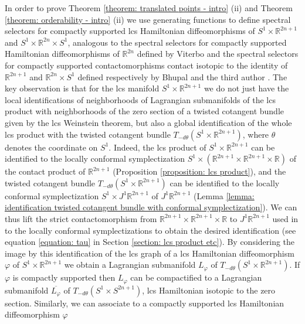 \documentclass{amsart}
\theoremstyle{remark}
\begin{document}
In order to prove Theorem \ref{theorem: translated points - intro} (ii)
and Theorem \ref{theorem: orderability - intro} (ii)
we use generating functions to define spectral selectors
for compactly supported lcs Hamiltonian diffeomorphisms
of $S^1 \times \mathbb{R}^{2n+1}$ and $S^1 \times \mathbb{R}^{2n} \times S^1$,
analogous to the spectral selectors for compactly supported
Hamiltonian diffeomorphisms of $\mathbb{R}^{2n}$
defined by Viterbo \cite{Viterbo}
and the spectral selectors for compactly supported contactomorphisms
contact isotopic to the identity of $\mathbb{R}^{2n+1}$ and $\mathbb{R}^{2n} \times S^1$
defined respectively by Bhupal \cite{Bhupal} and the third author \cite{San10, San11}.
The key observation is that
for the lcs manifold $S^1 \times \mathbb{R}^{2n+1}$
we do not just have the local identifications
of neighborhoods of Lagrangian submanifolds of the lcs product
with neighborhoods of the zero section of a twisted cotangent bundle
given by the lcs Weinstein theorem,
but also a global identification of the whole lcs product
with the twisted cotangent bundle $T_{-d\theta} (S^1 \times \mathbb{R}^{2n+1})$,
where $\theta$ denotes the coordinate on $S^1$.
Indeed,
the lcs product of $S^1 \times \mathbb{R}^{2n+1}$
can be identified to the locally conformal symplectization
$S^1 \times (\mathbb{R}^{2n+1} \times \mathbb{R}^{2n+1} \times \mathbb{R})$
of the contact product of $\mathbb{R}^{2n+1}$
(Proposition \ref{proposition: lcs product}),
and the twisted cotangent bundle $T_{-d\theta} (S^1 \times \mathbb{R}^{2n+1})$
can be identified to the locally conformal symplectization $S^1 \times J^1\mathbb{R}^{2n+1}$
of $J^1\mathbb{R}^{2n+1}$
(Lemma \ref{lemma: identification twisted cotangent bundle with conformal symplectization}).
We can thus lift the strict contactomorphism
from $\mathbb{R}^{2n+1} \times \mathbb{R}^{2n+1} \times \mathbb{R}$
to $J^1\mathbb{R}^{2n+1}$
used in \cite{Bhupal, San10, San11}
to the locally conformal symplectizations
to obtain the desired identification
(see equation \eqref{equation: tau} in Section \ref{section: lcs product etc}).
By considering the image by this identification
of the lcs graph of a lcs Hamiltonian diffeomorphism $\varphi$ of $S^1 \times \mathbb{R}^{2n+1}$
we obtain a Lagrangian submanifold $L_{\varphi}$ of $T_{-d\theta} (S^1 \times \mathbb{R}^{2n+1})$.
If $\varphi$ is compactly supported
then $L_{\varphi}$ can be compactified to a Lagrangian submanifold
$\overline{L_{\varphi}}$ of $T_{-d\theta} (S^1 \times S^{2n+1})$,
lcs Hamiltonian isotopic to the zero section.
Similarly,
we can associate to a compactly supported lcs Hamiltonian diffeomorphism $\varphi$
\end{document}

